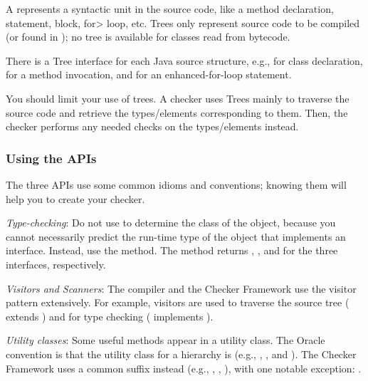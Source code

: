 A  represents a syntactic unit in the source code,
like a method declaration, statement, block, \<for> loop, etc. Trees only
represent source code to be compiled (or found in );
no tree is available for classes read from bytecode.

There is a Tree interface for each Java source structure, e.g.,
 for class declaration, 
for a method invocation, and  for an enhanced-for-loop
statement.

You should limit your use of trees. A checker uses Trees mainly to
traverse the source code and retrieve the types/elements corresponding to
them.  Then, the checker performs any needed checks on the types/elements instead.


\subsubsection{Using the APIs\label{using-the-apis}}

The three APIs use some common idioms and conventions; knowing them will
help you to create your checker.

\emph{Type-checking}:
Do not use  to determine the class of the object,
because you cannot necessarily predict the run-time type of the object that
implements an interface.  Instead, use the  method.  The
method returns ,
, and 
for the three interfaces, respectively.

\emph{Visitors and Scanners}:
The compiler and the Checker Framework use the visitor pattern
extensively. For example, visitors are used to traverse the source tree
( extends
) and for type
checking ( implements
).

\emph{Utility classes}:
Some useful methods appear in a utility class.  The Oracle convention is that
the utility class for a  hierarchy is  (e.g.,
, , and
).  The Checker Framework uses a common
 suffix instead (e.g., ,
, ), with one
notable exception: .


